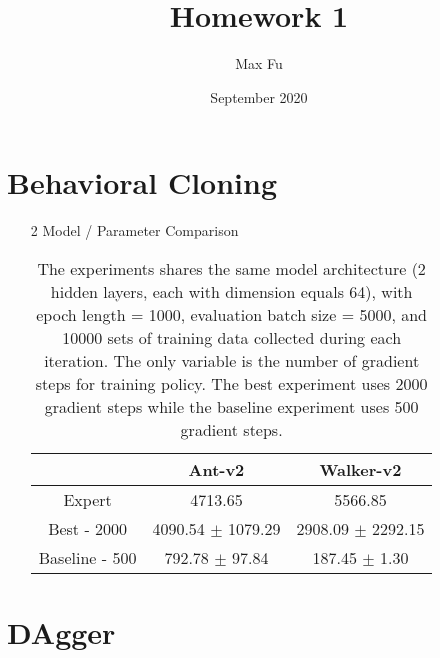 \documentclass{article}
\title{Homework 1}
\author{Max Fu}
\date{September 2020}
\begin{document}
\maketitle

\section{Behavioral Cloning}
\begin{enumerate}
    \item[2] Model / Parameter Comparison 

    \begin{table}[htbp]
        \centering
        \begin{tabular}{@{}ccc@{}}
        \toprule
                      & Ant-v2                             & Walker-v2                          \\ \midrule
        Expert        & 4713.65                            & 5566.85                            \\
        Best - 2000    & 4090.54 $\pm$ 1079.29 & 2908.09 $\pm$ 2292.15 \\
        Baseline - 500 & 792.78 $\pm$ 97.84    & 187.45 $\pm$ 1.30     \\ \bottomrule
        \end{tabular}
        \caption{The experiments shares the same model architecture (2 hidden layers, each with dimension equals 64), with epoch length = 1000, evaluation batch size = 5000, and 10000 sets of training data collected during each iteration. The only variable is the number of gradient steps for training policy. The best experiment uses 2000 gradient steps while the baseline experiment uses 500 gradient steps.}
    \end{table}
\end{enumerate}

\section{DAgger}
\end{document}
